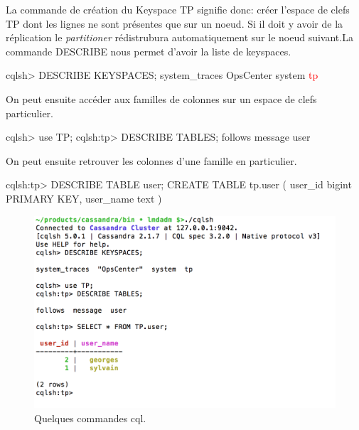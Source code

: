 \par La commande de création du Keyspace TP signifie donc: créer l'espace de clefs TP dont les lignes ne sont présentes que sur un noeud.
Si il doit y avoir de la réplication le \textit{partitioner} rédistrubura automatiquement sur le noeud suivant.\newline La commande DESCRIBE nous permet d'avoir la liste de keyspaces.\newline
\begin{tt} 
\indent cqlsh> DESCRIBE KEYSPACES; \newline 
\indent system\_traces  OpsCenter  system  \textcolor{red}{tp}\end{tt}\newline \newline
On peut ensuite accéder aux familles de colonnes sur un espace de clefs particulier.\newline
\begin{tt}
\indent cqlsh> use TP; \newline 
\indent cqlsh:tp> DESCRIBE TABLES;\newline 
\indent follows  message  user\end{tt}\newline \newline
On peut ensuite retrouver les colonnes d'une famille en particulier. \newline
\begin{tt}
\indent cqlsh:tp> DESCRIBE TABLE user; \newline 
\indent CREATE TABLE tp.user (\newline 
\indent \indent user\_id bigint PRIMARY KEY, \newline
\indent \indent user\_name text \newline 
\indent )\end{tt} 

\begin{figure}[h!]
\centering
\includegraphics[scale=0.5]{img/cqlsh.png}
\caption{Quelques commandes cql.}
\end{figure}

